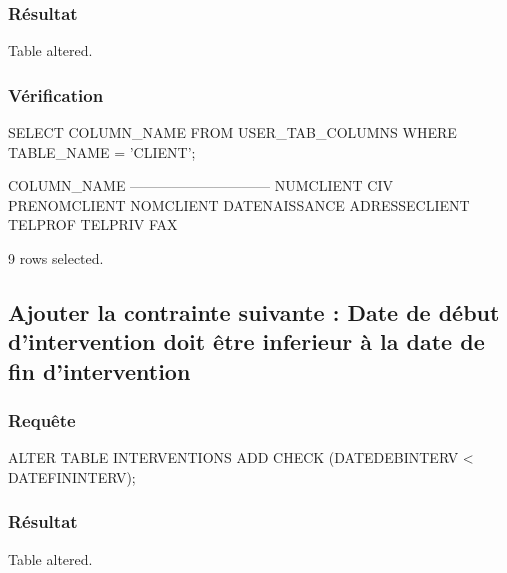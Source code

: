 \documentclass[•]{article}
\begin{document}
\subsubsection{Résultat}
\begin{sql}
Table altered.
\end{sql}
\subsubsection{Vérification}
\begin{sql}
SELECT COLUMN_NAME FROM USER_TAB_COLUMNS WHERE TABLE_NAME = 'CLIENT';

COLUMN_NAME                                                                     
------------------------------                                                  
NUMCLIENT                                                                       
CIV                                                                             
PRENOMCLIENT                                                                    
NOMCLIENT                                                                       
DATENAISSANCE                                                                   
ADRESSECLIENT                                                                   
TELPROF                                                                         
TELPRIV                                                                         
FAX                                                                             

9 rows selected.
\end{sql}
\subsection{Ajouter la contrainte suivante : Date de début d’intervention doit être inferieur à la date de fin d’intervention}
\subsubsection{Requête}
\begin{sql}
ALTER TABLE INTERVENTIONS ADD CHECK (DATEDEBINTERV < DATEFININTERV);
\end{sql}
\subsubsection{Résultat}
\begin{sql}
Table altered.
\end{sql}
\end{document}
